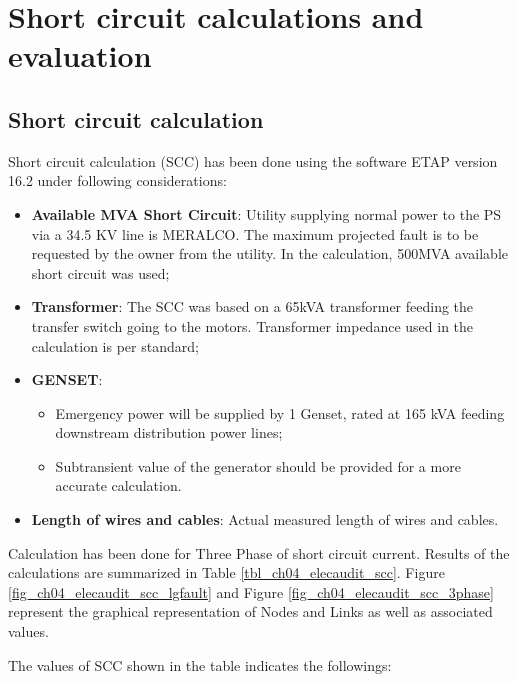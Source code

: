 %
\section{Short circuit calculations and evaluation} \label{ch04_elecaudit_shortcuircuitanalysis}
\subsection{Short circuit calculation}
Short circuit calculation (SCC) has been done using the software ETAP version 16.2 under following considerations:
\begin{itemize}
\item \textbf{Available MVA Short Circuit}: Utility supplying normal power to the PS  via a 34.5 KV line is MERALCO. The maximum projected fault is to be requested by the owner from the utility. In the calculation, 500MVA available short circuit was used;

\item \textbf{Transformer}: The SCC was based on a  65kVA transformer  feeding the transfer switch going to the motors. Transformer impedance used in the calculation is per standard;

\item \textbf{GENSET}: 
\begin{itemize}
\item Emergency power will be supplied by 1 Genset, rated at 165 kVA feeding downstream distribution power lines;%

\item Subtransient value of the generator should be provided for a more  accurate calculation. 

\end{itemize}

\item \textbf{Length of wires and cables}: Actual measured length of wires and cables.

\end{itemize}

Calculation has been done for Three Phase of short circuit current. Results of the calculations are summarized in Table \ref{tbl_ch04_elecaudit_scc}. Figure \ref{fig_ch04_elecaudit_scc_lgfault} and Figure \ref{fig_ch04_elecaudit_scc_3phase} represent the graphical representation of Nodes and Links as well as associated values.



The values of SCC shown in the table indicates the followings:


